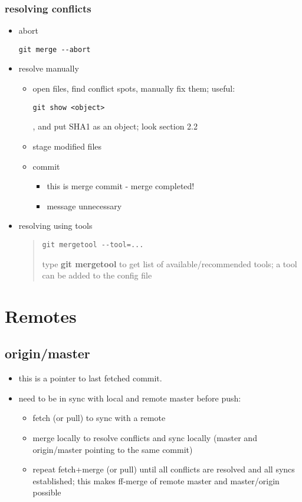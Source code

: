 \documentclass{report}
\begin{document}
\subsection{resolving conflicts}
\begin{itemize}
\item abort
\begin{verbatim}
git merge --abort
\end{verbatim}

\item resolve manually
\begin{itemize}
\item open files, find conflict spots, manually fix them; useful:
\begin{verbatim}
git show <object>
\end{verbatim}
, and put SHA1 as an object; look section 2.2
\item stage modified files
\item commit
\begin{itemize}
\item this is merge commit - merge completed!
\item message unnecessary
\end{itemize}
\end{itemize}

\item resolving using tools
\begin{quote}
\begin{verbatim}
git mergetool --tool=...
\end{verbatim}
type \textbf{git mergetool} to get list of available/recommended tools; a tool can be added to the config file
\end{quote}

\end{itemize}

\chapter{Remotes}
\section{origin/master}
\begin{itemize}
\item this is a pointer to last fetched commit.
\item need to be in sync with local and remote master before push:
\begin{itemize}
\item fetch (or pull) to sync with a remote
\item merge locally to resolve conflicts and sync locally (master and origin/master pointing to the same commit)
\item repeat fetch+merge (or pull) until all conflicts are resolved and all syncs established; this makes ff-merge of remote master and master/origin possible

\end{itemize}
\end{itemize}
\end{document}
